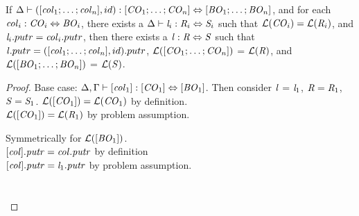 \begin{lemma}
\label{lem:id-dnf}
If $\Delta \vdash ([\mathit{col}_1 ; \ldots ; \mathit{col}_n],id) : [\mathit{CO}_1 ; \ldots ; \mathit{CO}_n] \Leftrightarrow [\mathit{BO}_1 ; \ldots ; \mathit{BO}_n]$,
and for each $\mathit{col}_i : \mathit{CO}_i \Leftrightarrow \mathit{BO}_i$,
there exists a $\Delta \vdash \mathit{l}_i : \mathit{R}_i \Leftrightarrow \mathit{S}_i$ such that
$\mathcal{L}(\mathit{CO}_i)=\mathcal{L}(\mathit{R}_i)$, and $\mathit{l}_i.putr = \mathit{col}_i.putr$,
then there exists a $\mathit{l} : \mathit{R} \Leftrightarrow \mathit{S}$ such that $\mathit{l}.putr = ([\mathit{col}_1 ; \ldots ; \mathit{col}_n],id).putr$, $\mathcal{L}([\mathit{CO}_1 ; \ldots ; \mathit{CO}_n])$ = $\mathcal{L}(\mathit{R})$,
and $\mathcal{L}([\mathit{BO}_1 ; \ldots ; \mathit{BO}_n])$ = $\mathcal{L}(\mathit{S})$.
\begin{proof}
Base case: $\Delta, \Gamma \vdash [\mathit{col}_1] : [\mathit{CO}_1] \Leftrightarrow [\mathit{BO}_1]$.  Then consider $\mathit{l}$ = $\mathit{l}_1$, $\mathit{R} = \mathit{R}_1$, $\mathit{S} = \mathit{S}_1$.
$\mathcal{L}([\mathit{CO}_1]) = \mathcal{L}(\mathit{CO}_1)$ by definition.\\
$\mathcal{L}([\mathit{CO}_1]) = \mathcal{L}(\mathit{R}_1)$ by problem assumption.

Symmetrically for $\mathcal{L}([\mathit{BO}_1])$.\\
$[\mathit{col}].\mathit{putr} = \mathit{col}.\mathit{putr}$ by definition\\
$[\mathit{col}].\mathit{putr} = \mathit{l}_1.\mathit{putr}$ by problem assumption.
\\\\\\




\end{proof}
\end{lemma}
